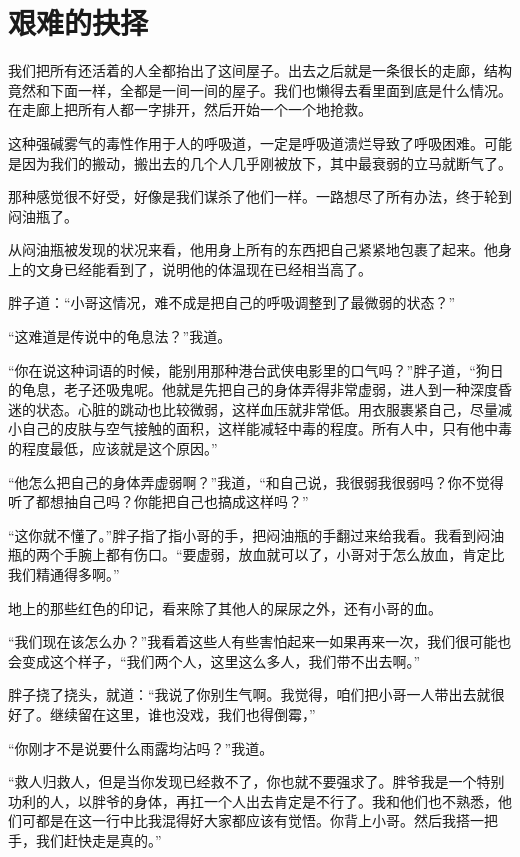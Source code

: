 \chapter{艰难的抉择}

我们把所有还活着的人全都抬出了这间屋子。出去之后就是一条很长的走廊，结构竟然和下面一样，全都是一间一间的屋子。我们也懒得去看里面到底是什么情况。在走廊上把所有人都一字排开，然后开始一个一个地抢救。

这种强碱雾气的毒性作用于人的呼吸道，一定是呼吸道溃烂导致了呼吸困难。可能是因为我们的搬动，搬出去的几个人几乎刚被放下，其中最衰弱的立马就断气了。

那种感觉很不好受，好像是我们谋杀了他们一样。一路想尽了所有办法，终于轮到闷油瓶了。

从闷油瓶被发现的状况来看，他用身上所有的东西把自己紧紧地包裹了起来。他身上的文身已经能看到了，说明他的体温现在已经相当高了。

胖子道：“小哥这情况，难不成是把自己的呼吸调整到了最微弱的状态？”

“这难道是传说中的龟息法？”我道。

“你在说这种词语的时候，能别用那种港台武侠电影里的口气吗？”胖子道，“狗日的龟息，老子还吸鬼呢。他就是先把自己的身体弄得非常虚弱，进人到一种深度昏迷的状态。心脏的跳动也比较微弱，这样血压就非常低。用衣服裹紧自己，尽量减小自己的皮肤与空气接触的面积，这样能减轻中毒的程度。所有人中，只有他中毒的程度最低，应该就是这个原因。”

“他怎么把自己的身体弄虚弱啊？”我道，“和自己说，我很弱我很弱吗？你不觉得听了都想抽自己吗？你能把自己也搞成这样吗？”

“这你就不懂了。”胖子指了指小哥的手，把闷油瓶的手翻过来给我看。我看到闷油瓶的两个手腕上都有伤口。“要虚弱，放血就可以了，小哥对于怎么放血，肯定比我们精通得多啊。”

地上的那些红色的印记，看来除了其他人的屎尿之外，还有小哥的血。

“我们现在该怎么办？”我看着这些人有些害怕起来一如果再来一次，我们很可能也会变成这个样子，“我们两个人，这里这么多人，我们带不出去啊。”

胖子挠了挠头，就道：“我说了你别生气啊。我觉得，咱们把小哥一人带出去就很好了。继续留在这里，谁也没戏，我们也得倒霉，”

“你刚才不是说要什么雨露均沾吗？”我道。

“救人归救人，但是当你发现已经救不了，你也就不要强求了。胖爷我是一个特别功利的人，以胖爷的身体，再扛一个人出去肯定是不行了。我和他们也不熟悉，他们可都是在这一行中比我混得好大家都应该有觉悟。你背上小哥。然后我搭一把手，我们赶快走是真的。”

